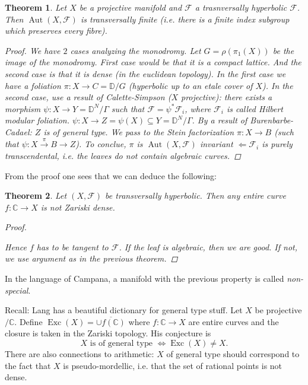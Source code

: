 \documentclass[12pt]{article}
\theoremstyle{darkgreentheorem}
\newtheorem{thm}{Theorem}[section]
\theoremstyle{darkbluedefinition}
\theoremstyle{darkredexample}
\theoremstyle{remark}
\newcommand{\1}{\mathbbm{1}}
\newcommand{\C}{\mathbb{C}}
\newcommand{\bbD}{\mathbb{D}}
\newcommand{\F}{\mathcal{F}}
\DeclareMathOperator{\Aut}{Aut}
\DeclareMathOperator{\Exc}{Exc}
\newcommand{\sub}{\subseteq}
\begin{document}
\begin{thm}
    Let $X$ be a projective manifold and $\F$ a trasnversally hyperbolic $\F$.
    Then $\Aut(X,\F)$ is transversally finite (i.e. there is a finite index subgroup which preserves every fibre).
    \begin{proof}
	We have $2$ cases analyzing the monodromy.
	Let $G=\rho(\pi_{1}(X))$ be the image of the monodromy.
	First case would be that it is a compact lattice.
	And the second case is that it is dense (in the euclidean topology).
	In the first case we have a foliation $\pi\colon X\to C=\bbD/G$ (hyperbolic up to an etale cover of $X$).
	In the second case, use a result of Calette-Simpson ($X$ projective): there exists a morphism $\psi\colon X\to Y=\bbD^{N}/\Gamma$ such that $\F=\psi^{*}\F_{i}$, where $\F_{i}$ is called Hilbert modular foliation.
	$\psi \colon X\to Z=\psi(X)\sub Y=\bbD^{N}/\Gamma$.
	By a result of Burenbarbe-Cadael: $Z$ is of general type.
	We pass to the Stein factorization $\pi \colon X\to B$ (such that $\psi\colon X\xrightarrow{\pi}B\to Z$).
	To conclue, $\pi$ is $\Aut(X,\F)$ invariant $\Leftarrow \F_{i}$ is purely transcendental, i.e. the leaves do not contain algebraic curves.
    \end{proof}
\end{thm}

From the proof one sees that we can deduce the following:

\begin{thm}
    Let $(X,\F)$ be transversally hyperbolic.
    Then any entire curve $f\colon \C\to X$ is not Zariski dense.
    \begin{proof}
	\begin{center}
	\end{center}
	Hence $f$ has to be tangent to $\F$.
	If the leaf is algebraic, then we are good.
	If not, we use argument as in the previous theorem.
    \end{proof}
\end{thm}

In the language of Campana, a manifold with the previous property is called \textit{non-special}.

Recall: Lang has a beautiful dictionary for general type stuff.
Let $X$ be projective $/\C$.
Define $\Exc(X)=\overline{\cup f(\C)}$ where $f\colon \C\to X$ are entire curves and the closure is taken in the Zariski topology.
His conjecture is
\[ X \text{ is of general type } \Leftrightarrow \Exc(X)\neq X.\]
There are also connections to arithmetic: $X$ of general type should correspond to the fact that $X$ is pseudo-mordellic, i.e. that the set of rational points is not dense.
\end{document}
